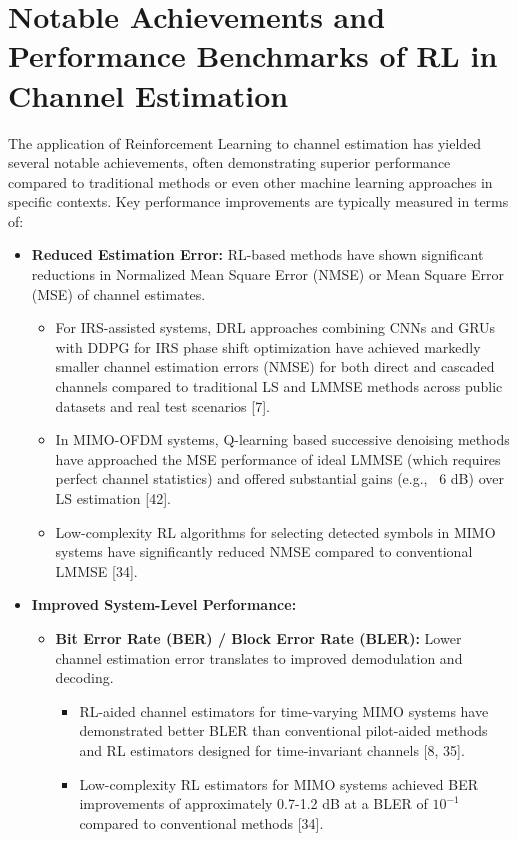 \documentclass[journal,twocolumn]{IEEEtran}
\begin{document}
\section{Notable Achievements and Performance Benchmarks of RL in Channel Estimation}
The application of Reinforcement Learning to channel estimation has yielded several notable achievements, often demonstrating superior performance compared to traditional methods or even other machine learning approaches in specific contexts. Key performance improvements are typically measured in terms of:

\begin{itemize}
    \item \textbf{Reduced Estimation Error:} RL-based methods have shown significant reductions in Normalized Mean Square Error (NMSE) or Mean Square Error (MSE) of channel estimates.
        \begin{itemize}
            \item For IRS-assisted systems, DRL approaches combining CNNs and GRUs with DDPG for IRS phase shift optimization have achieved markedly smaller channel estimation errors (NMSE) for both direct and cascaded channels compared to traditional LS and LMMSE methods across public datasets and real test scenarios [7].
            \item In MIMO-OFDM systems, Q-learning based successive denoising methods have approached the MSE performance of ideal LMMSE (which requires perfect channel statistics) and offered substantial gains (e.g., ~6 dB) over LS estimation [42].
            \item Low-complexity RL algorithms for selecting detected symbols in MIMO systems have significantly reduced NMSE compared to conventional LMMSE [34].
        \end{itemize}
    \item \textbf{Improved System-Level Performance:}
        \begin{itemize}
            \item \textbf{Bit Error Rate (BER) / Block Error Rate (BLER):} Lower channel estimation error translates to improved demodulation and decoding.
                \begin{itemize}
                    \item RL-aided channel estimators for time-varying MIMO systems have demonstrated better BLER than conventional pilot-aided methods and RL estimators designed for time-invariant channels [8, 35].
                    \item Low-complexity RL estimators for MIMO systems achieved BER improvements of approximately 0.7-1.2 dB at a BLER of $10^{-1}$ compared to conventional methods [34].

\end{itemize}
\end{itemize}
\end{itemize}
\end{document}
